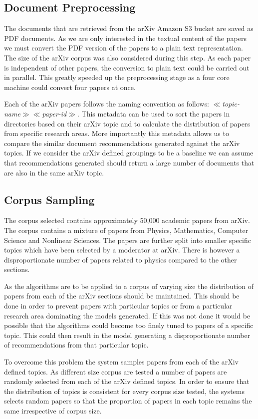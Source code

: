 \subsection{Document Preprocessing}
The documents that are retrieved from the arXiv Amazon S3 bucket are saved as PDF documents.
As we are only interested in the textual content of the papers we must convert the PDF version of the papers to a plain text representation.
The size of the arXiv corpus was also considered during this step.
As each paper is independent of other papers, the conversion to plain text could be carried out in parallel.
This greatly speeded up the preprocessing stage as a four core machine could convert four papers at once.

Each of the arXiv papers follows the naming convention as follows: \textit{$\ll$topic-name$\gg\ll$paper-id$\gg$}.
This metadata can be used to sort the papers in directories based on their arXiv topic and to calculate the distribution of papers from specific research areas.
More importantly this metadata allows us to compare the similar document recommendations generated against the arXiv topics.
If we consider the arXiv defined groupings to be a baseline we can assume that recommendations generated should return a large number of documents that are also in the same arXiv topic.

\subsection{Corpus Sampling}
The corpus selected contains approximately 50,000 academic papers from arXiv.
The corpus contains a mixture of papers from Physics, Mathematics, Computer Science and Nonlinear Sciences.
The papers are further split into smaller specific topics which have been selected by a moderator at arXiv.
There is however a disproportionate number of papers related to physics compared to the other sections.

As the algorithms are to be applied to a corpus of varying size the distribution of papers from each of the arXiv sections should be maintained.
This should be done in order to prevent papers with particular topics or from a particular research area dominating the models generated.
If this was not done it would be possible that the algorithms could become too finely tuned to papers of a specific topic.
This could then result in the model generating a disproportionate number of recommendations from that particular topic.

To overcome this problem the system samples papers from each of the arXiv defined topics.
As different size corpus are tested a number of papers are randomly selected from each of the arXiv defined topics.
In order to ensure that the distribution of topics is consistent for every corpus size tested, the systems selects random papers so that the proportion of papers in each topic remains the same irrespective of corpus size.

